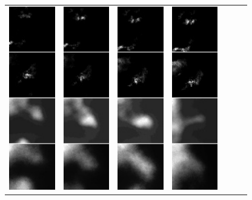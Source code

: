 \begin{figure}[h]
\begin{tabular}{lllllll}
\includegraphics[width=20mm]{abb/prediction/283_maxCont}&
\includegraphics[width=20mm]{abb/prediction/284_maxCont}&
\includegraphics[width=20mm]{abb/prediction/285_maxCont}&
\includegraphics[width=20mm]{abb/prediction/286_maxCont}

\end{tabular}
\end{figure}
